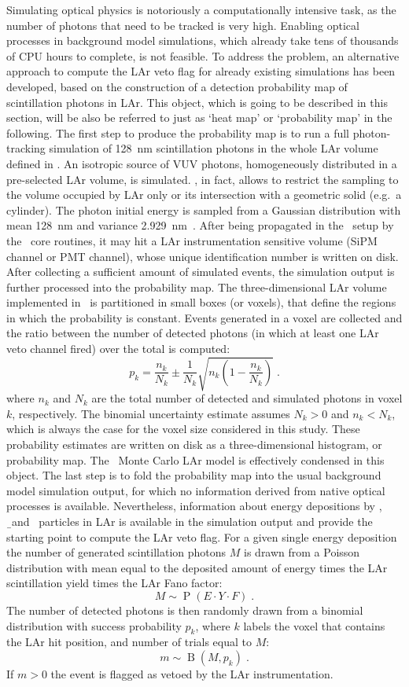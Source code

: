 Simulating optical physics is notoriously a computationally intensive task, as the number
of photons that need to be tracked is very high. Enabling optical processes in background
model simulations, which already take tens of thousands of CPU hours to complete, is not
feasible. To address the problem, an alternative approach to compute the LAr veto flag for
already existing simulations has been developed, based on the construction of a detection
probability map of scintillation photons in LAr. This object, which is going to be
described in this section, will be also be referred to just as `heat map' or
`probability map' in the following.
\newpar
The first step to produce the probability map is to run a full photon-tracking simulation
of 128~nm scintillation photons in the whole LAr volume defined in \mage. An isotropic
source of VUV photons, homogeneously distributed in a pre-selected LAr volume, is
simulated.  \mage, in fact, allows to restrict the sampling to the volume occupied by LAr
only or its intersection with a geometric solid (e.g.~a cylinder). The photon initial
energy is sampled from a Gaussian distribution with mean 128~nm and variance
2.929~nm~\cite{Heindl2010}. After being propagated in the \gerda\ setup by the \geant\
core routines, it may hit a LAr instrumentation sensitive volume (SiPM channel or PMT
channel), whose unique identification number is written on disk. After collecting
a sufficient amount of simulated events, the simulation output is further processed into
the probability map. The three-dimensional LAr volume implemented in \mage\ is partitioned
in small boxes (or voxels), that define the regions in which the probability is constant.
Events generated in a voxel are collected and the ratio between the number of detected
photons (in which at least one LAr veto channel fired) over the total is computed:
\[
  p_k = \frac{n_k}{N_k} \pm \frac{1}{N_k}\sqrt{n_k \left(1 - \frac{n_k}{N_k} \right)} \;.
\]
where $n_k$ and $N_k$ are the total number of detected and simulated photons in voxel $k$,
respectively. The binomial uncertainty estimate assumes $N_k>0$ and $n_k<N_k$, which is
always the case for the voxel size considered in this study.  These probability estimates
are written on disk as a three-dimensional histogram, or probability map. The \gerda\
Monte Carlo LAr model is effectively condensed in this object.
\newpar
The last step is to fold the probability map into the usual background model simulation
output, for which no information derived from native optical processes is available.
Nevertheless, information about energy depositions by \g, \b\ and \a\ particles in LAr is
available in the simulation output and provide the starting point to compute the LAr veto
flag. For a given single energy deposition the number of generated scintillation photons
$M$ is drawn from a Poisson distribution with mean equal to the deposited amount of energy
times the LAr scintillation yield times the LAr Fano factor:
\[
  M \sim \operatorname{P}(E \cdot Y \cdot F) \;.
\]
The number of detected photons is then randomly drawn from a binomial distribution with
success probability $p_k$, where $k$ labels the voxel that contains the LAr hit position,
and number of trials equal to $M$:
\[
  m \sim \operatorname{B}(M, p_k) \;.
\]
If $m>0$ the event is flagged as vetoed by the LAr instrumentation.

